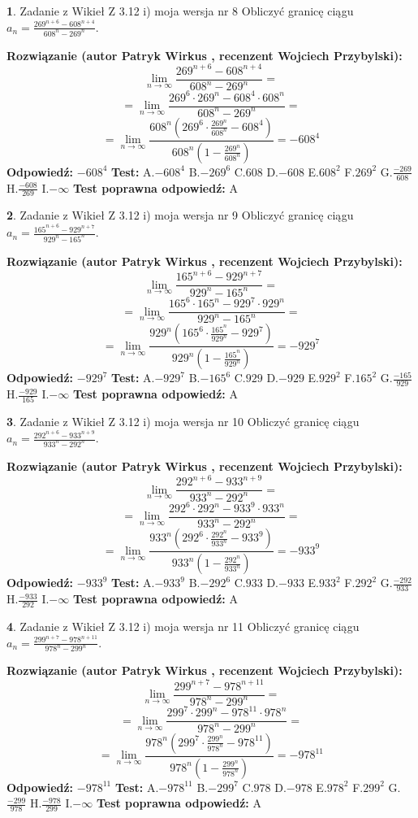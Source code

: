 \documentclass[12pt, a4paper]{article}
\theoremstyle{definition} %
\newtheorem{zad}{}
\newcommand{\zadStart}[1]{\begin{zad}#1\newline}
\newcommand{\zadStop}{\end{zad}}
\newcommand{\rozwStart}[2]{\noindent \textbf{Rozwiązanie (autor #1 , recenzent #2): }\newline}
\newcommand{\rozwStop}{\newline}
\newcommand{\odpStart}{\noindent \textbf{Odpowiedź:}\newline}
\newcommand{\odpStop}{\newline}
\newcommand{\testStart}{\noindent \textbf{Test:}\newline}
\newcommand{\testStop}{\newline}
\newcommand{\kluczStart}{\noindent \textbf{Test poprawna odpowiedź:}\newline}
\newcommand{\kluczStop}{\newline}
\begin{document}
\zadStart{Zadanie z Wikieł Z 3.12 i) moja wersja nr 8}
Obliczyć granicę ciągu $a_{n}=\frac{269^{n+6} - 608^{n+4}}{608^{n}-269^{n}}$.
\zadStop
\rozwStart{Patryk Wirkus}{Wojciech Przybylski}
$$\lim\limits_{n\to\infty}\frac{269^{n+6} - 608^{n+4}}{608^{n}-269^{n}}=$$
$$= \lim\limits_{n\to\infty}\frac{269^{6} \cdot 269^{n} - 608^{4} \cdot 608^{n}}{608^{n}-269^{n}}=$$
$$= \lim\limits_{n\to\infty}\frac{608^{n}(269^{6} \cdot \frac{269^{n}}{608^{n}} - 608^{4})}{608^{n}(1-\frac{269^{n}}{608^{n}})} = -608^{4}$$
\rozwStop
\odpStart
$-608^{4}$
\odpStop
\testStart
A.$-608^{4}$
B.$-269^{6}$
C.$608$
D.$-608$
E.$608^{2}$
F.$269^{2}$
G.$\frac{-269}{608}$
H.$\frac{-608}{269}$
I.$-\infty$
\testStop
\kluczStart
A
\kluczStop



\zadStart{Zadanie z Wikieł Z 3.12 i) moja wersja nr 9}
Obliczyć granicę ciągu $a_{n}=\frac{165^{n+6} - 929^{n+7}}{929^{n}-165^{n}}$.
\zadStop
\rozwStart{Patryk Wirkus}{Wojciech Przybylski}
$$\lim\limits_{n\to\infty}\frac{165^{n+6} - 929^{n+7}}{929^{n}-165^{n}}=$$
$$= \lim\limits_{n\to\infty}\frac{165^{6} \cdot 165^{n} - 929^{7} \cdot 929^{n}}{929^{n}-165^{n}}=$$
$$= \lim\limits_{n\to\infty}\frac{929^{n}(165^{6} \cdot \frac{165^{n}}{929^{n}} - 929^{7})}{929^{n}(1-\frac{165^{n}}{929^{n}})} = -929^{7}$$
\rozwStop
\odpStart
$-929^{7}$
\odpStop
\testStart
A.$-929^{7}$
B.$-165^{6}$
C.$929$
D.$-929$
E.$929^{2}$
F.$165^{2}$
G.$\frac{-165}{929}$
H.$\frac{-929}{165}$
I.$-\infty$
\testStop
\kluczStart
A
\kluczStop



\zadStart{Zadanie z Wikieł Z 3.12 i) moja wersja nr 10}
Obliczyć granicę ciągu $a_{n}=\frac{292^{n+6} - 933^{n+9}}{933^{n}-292^{n}}$.
\zadStop
\rozwStart{Patryk Wirkus}{Wojciech Przybylski}
$$\lim\limits_{n\to\infty}\frac{292^{n+6} - 933^{n+9}}{933^{n}-292^{n}}=$$
$$= \lim\limits_{n\to\infty}\frac{292^{6} \cdot 292^{n} - 933^{9} \cdot 933^{n}}{933^{n}-292^{n}}=$$
$$= \lim\limits_{n\to\infty}\frac{933^{n}(292^{6} \cdot \frac{292^{n}}{933^{n}} - 933^{9})}{933^{n}(1-\frac{292^{n}}{933^{n}})} = -933^{9}$$
\rozwStop
\odpStart
$-933^{9}$
\odpStop
\testStart
A.$-933^{9}$
B.$-292^{6}$
C.$933$
D.$-933$
E.$933^{2}$
F.$292^{2}$
G.$\frac{-292}{933}$
H.$\frac{-933}{292}$
I.$-\infty$
\testStop
\kluczStart
A
\kluczStop



\zadStart{Zadanie z Wikieł Z 3.12 i) moja wersja nr 11}
Obliczyć granicę ciągu $a_{n}=\frac{299^{n+7} - 978^{n+11}}{978^{n}-299^{n}}$.
\zadStop
\rozwStart{Patryk Wirkus}{Wojciech Przybylski}
$$\lim\limits_{n\to\infty}\frac{299^{n+7} - 978^{n+11}}{978^{n}-299^{n}}=$$
$$= \lim\limits_{n\to\infty}\frac{299^{7} \cdot 299^{n} - 978^{11} \cdot 978^{n}}{978^{n}-299^{n}}=$$
$$= \lim\limits_{n\to\infty}\frac{978^{n}(299^{7} \cdot \frac{299^{n}}{978^{n}} - 978^{11})}{978^{n}(1-\frac{299^{n}}{978^{n}})} = -978^{11}$$
\rozwStop
\odpStart
$-978^{11}$
\odpStop
\testStart
A.$-978^{11}$
B.$-299^{7}$
C.$978$
D.$-978$
E.$978^{2}$
F.$299^{2}$
G.$\frac{-299}{978}$
H.$\frac{-978}{299}$
I.$-\infty$
\testStop
\kluczStart
A
\kluczStop
\end{document}
